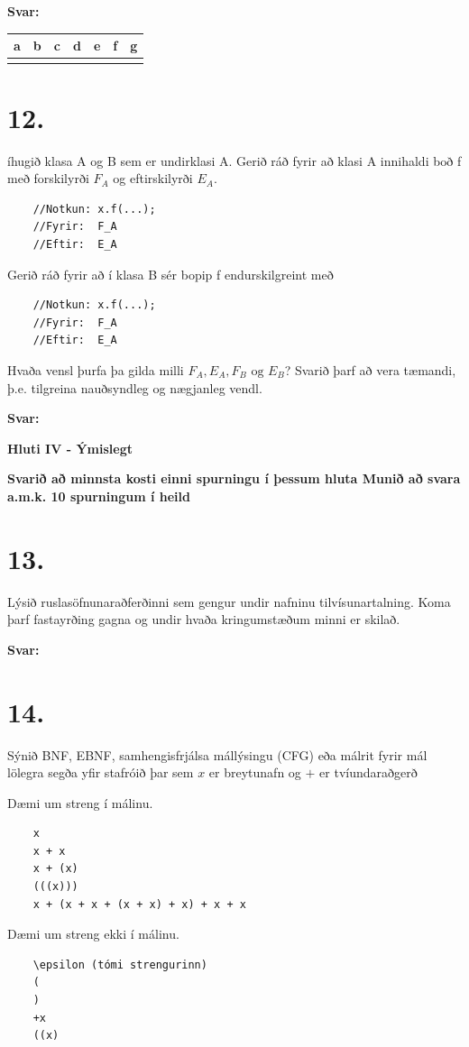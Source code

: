 \documentclass{article}
\newcommand{\sv}{\textbf{Svar:}}
\newcommand{\bo}[1]{\textbf{#1}}
\begin{document}
    \sv

    
\begin{tabularx}{\textwidth}{ |X|X|X|X|X|X|X|}
    \hline
    \textbf{a}  & \textbf{b}  & \textbf{c}  & \textbf{d}  & \textbf{e}  & \textbf{f}  & \textbf{g} \\ \hline
     & & & & & & \\ \hline
 \end{tabularx}


 \newpage

 \section{12.}

 íhugið klasa A og B sem er undirklasi A. Gerið ráð fyrir að klasi A innihaldi boð f með forskilyrði $F_A$ og eftirskilyrði $E_A$.
 \begin{verbatim}
    //Notkun: x.f(...);
    //Fyrir:  F_A
    //Eftir:  E_A
 \end{verbatim}

 Gerið ráð fyrir að í klasa B sér bopip f endurskilgreint með
 \begin{verbatim}
    //Notkun: x.f(...);
    //Fyrir:  F_A
    //Eftir:  E_A
 \end{verbatim}

 Hvaða vensl þurfa þa gilda milli $F_A, E_A, F_B \text{ og } E_B$? Svarið þarf að
 vera tæmandi, þ.e. tilgreina nauðsyndleg og nægjanleg vendl.

 \sv

 \newpage

 \begin{center}
    \bo{Hluti IV - Ýmislegt}


    \bo{Svarið að minnsta kosti einni spurningu í þessum hluta 
    Munið að svara a.m.k. 10 spurningum í heild}
 \end{center}

 \section{13.}
 Lýsið ruslasöfnunaraðferðinni sem gengur undir nafninu 
 tilvísunartalning. Koma þarf fastayrðing gagna og undir hvaða 
 kringumstæðum minni er skilað.


 \sv

 \newpage
 \section{14.}
 Sýnið BNF, EBNF, samhengisfrjálsa mállýsingu (CFG) eða málrit
 fyrir mál lölegra segða yfir stafróið  þar sem $x$ er
 breytunafn og $+$ er tvíundaraðgerð

 Dæmi um streng í málinu.
 \begin{verbatim}
    x
    x + x
    x + (x)
    (((x)))
    x + (x + x + (x + x) + x) + x + x
 \end{verbatim}
 
 Dæmi um streng ekki í málinu.

\begin{verbatim}
    \epsilon (tómi strengurinn)
    (
    )
    +x
    ((x)
 \end{verbatim}
\end{document}

